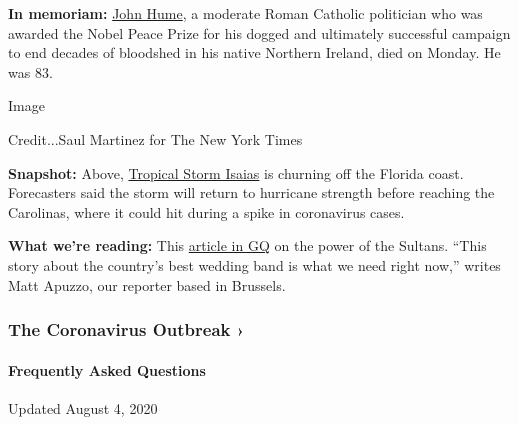 \textbf{In memoriam:}
\href{https://www.nytimes.com/2020/08/03/obituaries/john-hume-dies.html}{John
Hume}, a moderate Roman Catholic politician who was awarded the Nobel
Peace Prize for his dogged and ultimately successful campaign to end
decades of bloodshed in his native Northern Ireland, died on Monday. He
was 83.

Image

Credit...Saul Martinez for The New York Times

\textbf{Snapshot:} Above,
\href{https://www.nytimes.com/2020/08/03/us/isaias-storm-updates.html\#link-17297d4d}{Tropical
Storm Isaias} is churning off the Florida coast. Forecasters said the
storm will return to hurricane strength before reaching the Carolinas,
where it could hit during a spike in coronavirus cases.

\textbf{What we're reading:} This
\href{https://www.gq.com/story/americas-best-wedding-band-the-sultans}{article
in GQ} on the power of the Sultans. ``This story about the country's
best wedding band is what we need right now,'' writes Matt Apuzzo, our
reporter based in Brussels.

\href{https://www.nytimes.com/news-event/coronavirus?action=click\&pgtype=Article\&state=default\&region=MAIN_CONTENT_3\&context=storylines_faq}{}

\hypertarget{the-coronavirus-outbreak-}{%
\subsubsection{The Coronavirus Outbreak
›}\label{the-coronavirus-outbreak-}}

\hypertarget{frequently-asked-questions}{%
\paragraph{Frequently Asked
Questions}\label{frequently-asked-questions}}

Updated August 4, 2020

